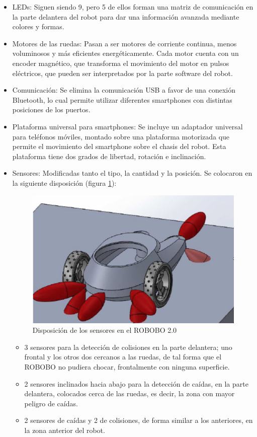 \begin{itemize}	

	\item LEDs: Siguen siendo 9, pero 5 de ellos forman una matriz de comunicación en la parte delantera del robot para dar una información avanzada mediante colores y formas.
	\item Motores de las ruedas: Pasan a ser motores de corriente continua, menos voluminosos y más eficientes energéticamente. Cada motor cuenta con un encoder magnético, que transforma el movimiento del motor en pulsos eléctricos, que pueden ser interpretados por la parte software del robot.
	\item Comunicación: Se elimina la comunicación USB a favor de una conexión Bluetooth, lo cual permite utilizar diferentes smartphones con distintas posiciones de los puertos.
	\item Plataforma universal para smartphones: Se incluye un adaptador universal para teléfonos móviles, montado sobre una plataforma motorizada que permite el movimiento del smartphone sobre el chasis del robot. Esta plataforma tiene dos grados de libertad, rotación e inclinación.
	\item Sensores: Modificadas tanto el tipo, la cantidad y la posición. Se colocaron en la siguiente disposición (figura \ref{fig:robobo_2_0_sensors}):
	\begin{figure}
	\centering
	\includegraphics[width=0.8\linewidth]{imagenes/robobo_2_sensors.png}
	\caption{Disposición de los sensores en el ROBOBO 2.0}
	\label{fig:robobo_2_0_sensors}
\end{figure} 
	\begin{itemize}
	\item 3 sensores para la detección de colisiones en la parte delantera; uno frontal y los otros dos cercanos a las ruedas, de tal forma que el ROBOBO no pudiera chocar, frontalmente con ninguna superficie.
	\item 2 sensores inclinados hacia abajo para la detección de caídas, en la parte delantera, colocados cerca de las ruedas, es decir, la zona con mayor peligro de caídas.
	\item 2 sensores de caídas y 2 de colisiones, de forma similar a los anteriores, en la zona anterior del robot. 
	

\end{itemize}
\end{itemize}
